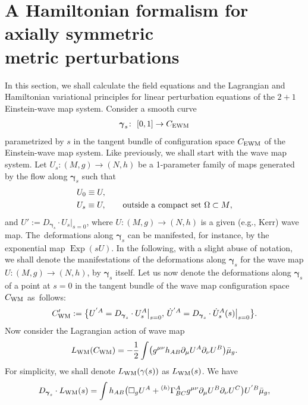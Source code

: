 \documentclass[pdftex]{sigma}
\def\ptl{\partial}%
\def\mbo#1{\boldsymbol{#1}}%
\newcommand{\leftexp}[2]{{\vphantom{#2}}^{#1}{#2}}
\def\halb{\frac{1}{2}}%
\numberwithin{equation}{section}
\begin{document}
\section[A Hamiltonian formalism for axially symmetric metric perturbations]{A Hamiltonian formalism for axially symmetric\\ metric perturbations}\label{section3}

In this section, we shall calculate the field equations and the Lagrangian and Hamiltonian variational principles for linear perturbation equations of the $2 + 1$ Einstein-wave map system. Consider a smooth curve
\begin{align*}
\mbo{\gamma}_s \colon\ [0, 1] \to C_{{\rm EWM}}
\end{align*}
parametrized by $s$ in the tangent bundle of configuration space $C_{{\rm EWM}}$ of the Einstein-wave map system. Like previously, we shall start with the wave map system. Let $U_s \colon (M, g) \to (N, h)$ be a 1-parameter family of maps generated by the flow along $\mbo{\gamma}_s$ such that
\begin{align*}
&U_0 \equiv U, \\
& U_s \equiv U, \qquad \textnormal{outside a compact set $\Omega \subset M$},
\end{align*}
and $ U' := D_{\mbo{\gamma}_s} \cdot U_s \big\vert_{s=0}$, where $U \colon (M, g) \to (N, h)$ is a given (e.g., Kerr) wave map. The~deformations along $\mbo{\gamma}_s$ can be manifested, for instance, by the exponential map $\operatorname{Exp}(s U)$. In the following, with a slight abuse of notation, we shall denote the manifestations of the deformations along $\mbo{\gamma}_s$ for the wave map $U \colon (M,g) \to (N, h)$, by $\mbo{\gamma}_s$ itself. Let us now denote the deformations along $\mbo{\gamma}_s$ of a point at $s=0$ in the tangent bundle of the wave map configuration space $C_{{\rm WM}}$ as~follows:
\begin{align*}
C'_{ {\rm WM}} := \bigl\{
U^{'A} = D_{\mbo{\gamma}_s} \cdot U_s^{A} \big\vert_{s=0}, \, \dot{U}^{'A} = D_{\mbo{\gamma}_s} \cdot \dot{U}_s^{A} (s) \big\vert_{s=0} \bigr\}.
\end{align*}
Now consider the Lagrangian action of wave map
\begin{align} \label{wm-action-again}
L_{{\rm WM}} (C_{{\rm WM}}) = -\halb \int \bigl(g^{\mu \nu}h_{AB} \ptl_\mu U^A \ptl_\nu U^B\bigr) \bar{\mu}_g.
\end{align}
For simplicity, we shall denote $L_{{\rm WM}}(\gamma(s))$ as $L_{{\rm WM}}(s)$. We have
\begin{align}\label{1-var-wm}
D_{\mbo{\gamma}_s} \cdot L_{{\rm WM}}(s) = \int h_{AB} \bigl(\square_g U^A + \leftexp{(h)}{\Gamma}^A_{BC} g^{\mu \nu} \ptl_\mu U^B \ptl_\nu U^C\bigr) U^{'B} \bar{\mu}_g,
\end{align}
\end{document}
